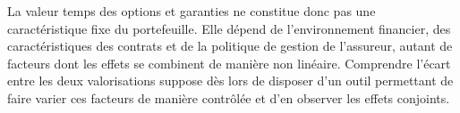 La valeur temps des options et garanties ne constitue donc pas une
caractéristique fixe du portefeuille. Elle dépend de l'environnement
financier, des caractéristiques des contrats et de la politique de gestion de
l'assureur, autant de facteurs dont les effets se combinent de manière non
linéaire. Comprendre l'écart entre les deux valorisations suppose dès lors de
disposer d'un outil permettant de faire varier ces facteurs de manière
contrôlée et d'en observer les effets conjoints.
